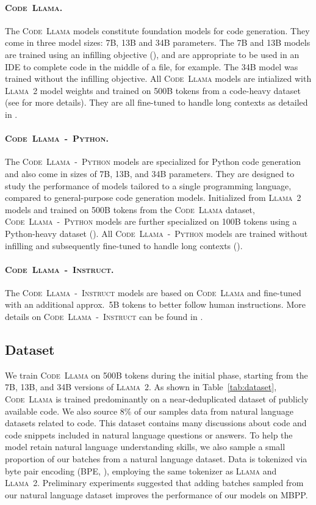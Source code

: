 \documentclass[10pt]{article}
\newcommand{\model}{\textsc{Code~Llama}\xspace}
\newcommand{\instmodel}{\textsc{Code~Llama~-~Instruct}\xspace}
\newcommand{\pymodel}{\textsc{Code~Llama~-~Python}\xspace}
\newcommand{\llama}{\textsc{Llama}\xspace}
\newcommand{\llamavtwo}{\textsc{Llama~2}\xspace}
\begin{document}
\paragraph{\model.} The \model models constitute foundation models for code generation.
They come in three model sizes: 7B, 13B and 34B parameters. 
The 7B and 13B models are trained using an infilling objective (), and are appropriate to be used in an IDE to complete code in the middle of a file, for example.
The 34B model was trained without the infilling objective.
All \model models are intialized with \llamavtwo model weights and trained on 500B tokens from a code-heavy dataset (see  for more details).
They are all fine-tuned to handle long contexts as detailed in .

\paragraph{\pymodel.} The \pymodel models are specialized for Python code generation and also come in sizes of 7B, 13B, and 34B parameters.
They are designed to study the performance of models tailored to a single programming language, compared to general-purpose code generation models. 
Initialized from \llamavtwo models and trained on 500B tokens from the \model dataset, \pymodel models are further specialized on 100B tokens using a Python-heavy dataset ().
All \pymodel models are trained without infilling and subsequently fine-tuned to handle long contexts ().

\paragraph{\instmodel.} The \instmodel models are based on \model and fine-tuned with an additional approx.~5B tokens to 
better follow human instructions.
More details on \instmodel can be found in .


\subsection{Dataset}
\label{sec:dataset}
We train \model on 500B tokens during the initial phase, starting from the 7B, 13B, and 34B versions of \llamavtwo. 
As shown in Table~\ref{tab:dataset}, \model is trained predominantly on a near-deduplicated dataset of publicly available code. 
We also source 8\% of our samples data from natural language datasets related to code. 
This dataset contains many discussions about code and code snippets included in natural language questions or answers. 
To help the model retain natural language understanding skills, we also sample a small proportion of our batches from a natural language dataset. 
Data is tokenized via byte pair encoding (BPE, \citet{sennrich2016neural}), employing the same tokenizer as \llama and \llamavtwo.
Preliminary experiments suggested that adding batches sampled from our natural language dataset improves the performance of our models on MBPP. 
\end{document}
